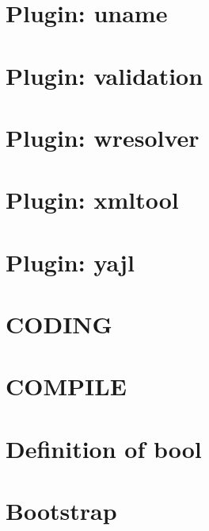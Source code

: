 \documentclass[twoside]{book}
\newcommand{\+}{\discretionary{\mbox{\scriptsize$\hookleftarrow$}}{}{}}
\begin{document}
\chapter{Plugin\+: uname}
\label{md_src_plugins_uname_README}
\hypertarget{md_src_plugins_uname_README}{}

\chapter{Plugin\+: validation}
\label{md_src_plugins_validation_README}
\hypertarget{md_src_plugins_validation_README}{}

\chapter{Plugin\+: wresolver}
\label{md_src_plugins_wresolver_README}
\hypertarget{md_src_plugins_wresolver_README}{}

\chapter{Plugin\+: xmltool}
\label{md_src_plugins_xmltool_README}
\hypertarget{md_src_plugins_xmltool_README}{}

\chapter{Plugin\+: yajl}
\label{md_src_plugins_yajl_README}
\hypertarget{md_src_plugins_yajl_README}{}

\chapter{C\+O\+D\+I\+N\+G}
\label{doc_CODING_md}
\hypertarget{doc_CODING_md}{}

\chapter{C\+O\+M\+P\+I\+L\+E}
\label{doc_COMPILE_md}
\hypertarget{doc_COMPILE_md}{}

\chapter{Definition of bool}
\label{doc_decisions_bool_md}
\hypertarget{doc_decisions_bool_md}{}

\chapter{Bootstrap}
\label{doc_decisions_bootstrap_md}
\hypertarget{doc_decisions_bootstrap_md}{}

\end{document}
